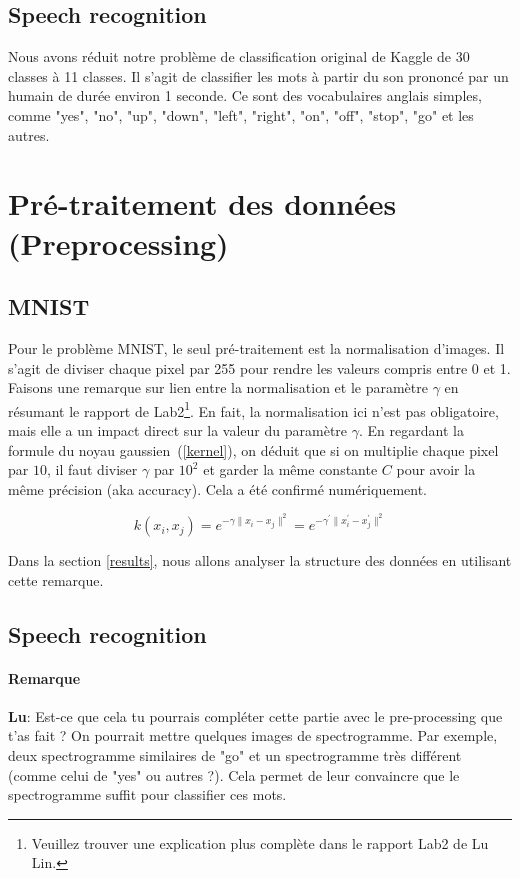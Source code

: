 \documentclass[12 pt, a4paper]{article}
\begin{document}
\subsection{Speech recognition}
Nous avons réduit notre problème de classification original de Kaggle de 30 classes à 11 classes. Il s'agit de classifier les mots à partir du son prononcé par un humain de durée environ 1 seconde. Ce sont des vocabulaires anglais simples, comme "yes", "no", "up", "down", "left", "right", "on", "off", "stop", "go" et les autres.



\section{Pré-traitement des données (Preprocessing)}
\subsection{MNIST}
Pour le problème MNIST, le seul pré-traitement est la normalisation d'images. Il s'agit de diviser chaque pixel par 255 pour rendre les valeurs compris entre 0 et 1. Faisons une remarque sur lien entre la normalisation et le paramètre $\gamma$ en résumant le rapport de Lab2\footnote{Veuillez trouver une explication plus complète dans le rapport Lab2 de Lu Lin.}. En fait, la normalisation ici n'est pas obligatoire, mais elle a un impact direct sur la valeur du paramètre $\gamma$. En regardant la formule du noyau gaussien~(\ref{kernel}), on déduit que si on multiplie chaque pixel par $10$, il faut diviser $\gamma$ par $10^{2}$ et garder la même constante $C$ pour avoir la même précision (aka accuracy). Cela a été confirmé numériquement. 

\begin{equation}\label{kernel}
k(x_{i}, x_{j}) = e^{-\gamma \| x_{i}- x_{j} \|^{2}} = e^{-\gamma^{\prime} \| x_{i}^{\prime}-x_{j}^{\prime}\|^{2}}
\end{equation}

Dans la section \ref{results}, nous allons analyser la structure des données en utilisant cette remarque.

\subsection{Speech recognition}

\paragraph{Remarque}
\textbf{Lu}: Est-ce que cela tu pourrais compléter cette partie avec le pre-processing que t'as fait ? On pourrait mettre quelques images de spectrogramme. Par exemple, deux spectrogramme similaires de "go" et un spectrogramme très différent (comme celui de "yes" ou autres ?). Cela permet de leur convaincre que le spectrogramme suffit pour classifier ces mots.
\end{document}
